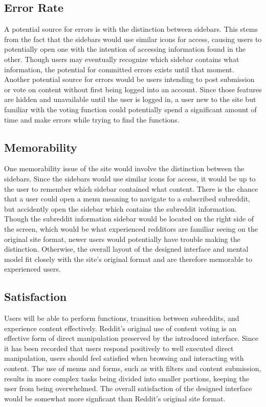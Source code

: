 \documentclass{article}
\begin{document}
\subsection{Error Rate} A potential source for errors is with the distinction between sidebars. This stems from the fact that the sidebars would use similar icons for access, causing users to potentially open one with the intention of accessing information found in the other. Though users may eventually recognize which sidebar contains what information, the potential for committed errors exists until that moment. Another potential source for errors would be users intending to post submission or vote on content without first being logged into an account. Since those features are hidden and unavailable until the user is logged in, a user new to the site but familiar with the voting function could potentially spend a significant amount of time and make errors while trying to find the functions.

\subsection{Memorability} One memorability issue of the site would involve the distinction between the sidebars. Since the sidebars would use similar icons for access, it would be up to the user to remember which sidebar contained what content. There is the chance that a user could open a menu meaning to navigate to a subscribed subreddit, but accidently open the sidebar which contains the subreddit information. Though the subreddit information sidebar would be located on the right side of the screen, which would be what experienced redditors are familiar seeing on the original site format, newer users would potentially have trouble making the distinction. Otherwise, the overall layout of the designed interface and mental model fit closely with the site's original format and are therefore memorable to experienced users.

\subsection{Satisfaction} Users will be able to perform functions, transition between subreddits, and experience content effectively. Reddit's original use of content voting is an effective form of direct manipulation preserved by the introduced interface. Since it has been recorded that users respond positively to well executed direct manipulation, users should feel satisfied when browsing and interacting with content. The use of menus and forms, such as with filters and content submission, results in more complex tasks being divided into smaller portions, keeping the user from being overwhelmed. The overall satisfaction of the designed interface would be somewhat more signficant than Reddit's original site format.
\end{document}
